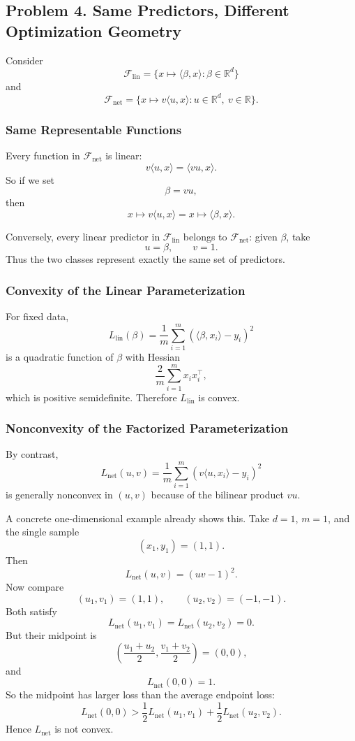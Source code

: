 \documentclass{article}
\begin{document}
\subsection{Problem 4. Same Predictors, Different Optimization Geometry}

Consider
$$
\mathcal{F}_{\mathrm{lin}}
=
\{x\mapsto \langle \beta,x\rangle : \beta\in\mathbb{R}^d\}
$$
and
$$
\mathcal{F}_{\mathrm{net}}
=
\{x\mapsto v\langle u,x\rangle : u\in\mathbb{R}^d,\ v\in\mathbb{R}\}.
$$

\subsubsection{Same Representable Functions}

Every function in $\mathcal{F}_{\mathrm{net}}$ is linear:
$$
v\langle u,x\rangle = \langle vu,x\rangle.
$$
So if we set
$$
\beta=vu,
$$
then
$$
x\mapsto v\langle u,x\rangle
=
x\mapsto \langle \beta,x\rangle.
$$

Conversely, every linear predictor in $\mathcal{F}_{\mathrm{lin}}$ belongs to $\mathcal{F}_{\mathrm{net}}$: given $\beta$, take
$$
u=\beta,
\qquad
v=1.
$$
Thus the two classes represent exactly the same set of predictors.

\subsubsection{Convexity of the Linear Parameterization}

For fixed data,
$$
L_{\mathrm{lin}}(\beta)
=
\frac1m \sum_{i=1}^m (\langle \beta,x_i\rangle-y_i)^2
$$
is a quadratic function of $\beta$ with Hessian
$$
\frac{2}{m}\sum_{i=1}^m x_i x_i^\top,
$$
which is positive semidefinite. Therefore $L_{\mathrm{lin}}$ is convex.

\subsubsection{Nonconvexity of the Factorized Parameterization}

By contrast,
$$
L_{\mathrm{net}}(u,v)
=
\frac1m \sum_{i=1}^m (v\langle u,x_i\rangle-y_i)^2
$$
is generally nonconvex in $(u,v)$ because of the bilinear product $vu$.

A concrete one-dimensional example already shows this. Take $d=1$, $m=1$, and the single sample
$$
(x_1,y_1)=(1,1).
$$
Then
$$
L_{\mathrm{net}}(u,v)=(uv-1)^2.
$$
Now compare
$$
(u_1,v_1)=(1,1),
\qquad
(u_2,v_2)=(-1,-1).
$$
Both satisfy
$$
L_{\mathrm{net}}(u_1,v_1)=L_{\mathrm{net}}(u_2,v_2)=0.
$$
But their midpoint is
$$
\left(\frac{u_1+u_2}{2},\frac{v_1+v_2}{2}\right)=(0,0),
$$
and
$$
L_{\mathrm{net}}(0,0)=1.
$$
So the midpoint has larger loss than the average endpoint loss:
$$
L_{\mathrm{net}}(0,0)
>
\frac12 L_{\mathrm{net}}(u_1,v_1)+\frac12 L_{\mathrm{net}}(u_2,v_2).
$$
Hence $L_{\mathrm{net}}$ is not convex.
\end{document}
